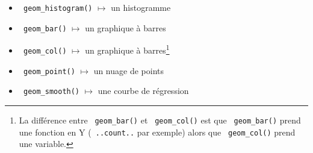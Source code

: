 \documentclass[10.5pt,a4paper]{article}
\newcommand{\rcode}[1]{\texttt{\color{rstudio} #1}}
\begin{document}
  \begin{itemize}
    \item \rcode{geom\_histogram()} $\mapsto$ un histogramme
    \item \rcode{geom\_bar()} $\mapsto$ un graphique à barres
    \item \rcode{geom\_col()} $\mapsto$ un graphique à barres\footnote{La différence entre \rcode{geom\_bar()} et \rcode{geom\_col()} est que \rcode{geom\_bar()} prend une fonction en Y (\rcode{..count..} par exemple) alors que \rcode{geom\_col()} prend une variable.}
    \item \rcode{geom\_point()} $\mapsto$ un nuage de points
    \item \rcode{geom\_smooth()} $\mapsto$ une courbe de régression
  \end{itemize}
  
\end{document}
